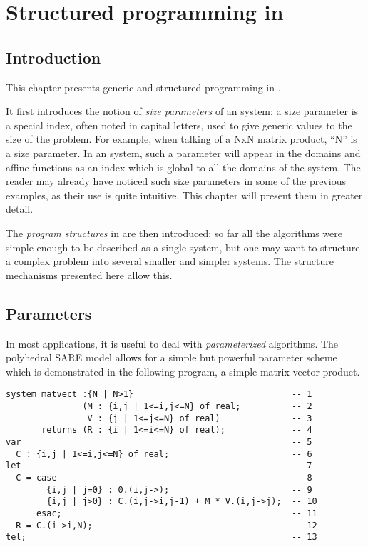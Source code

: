 

\chapter{Structured programming in {\alfa}}
\label{chapssubsystems}


\section{Introduction}

This chapter presents  generic and structured
programming in {\alfa}.

It first introduces the notion of \emph{size parameters} of an {\alfa}
system: a size parameter is a special index, often noted in capital
letters, used to give generic values to the size of the
problem. For example, when talking of a NxN matrix product, ``N'' is a
size parameter. In an {\alfa} system, such a parameter will appear in
the domains and affine functions as an index which is global to all
the domains of the system. The reader may already have noticed such
size parameters in some of the previous examples, as their use is
quite intuitive. This chapter will present them in greater detail.

The \emph{program structures} in {\alfa} are then introduced: so far
all the algorithms were simple enough to be described as a single
{\alfa} system, but one may want to structure a complex problem into
several smaller and simpler {\alfa} systems. The structure mechanisms
presented here allow this.
 

\section{Parameters\label{parameters}}

In most applications, it is useful to deal with \emph{parameterized}
algorithms. The polyhedral SARE model allows for a simple but powerful
parameter scheme which is demonstrated in the following program, a
simple matrix-vector product.

\begin{verbatim}
system matvect :{N | N>1}                               -- 1  
               (M : {i,j | 1<=i,j<=N} of real;          -- 2  
                V : {j | 1<=j<=N} of real)              -- 3  
       returns (R : {i | 1<=i<=N} of real);             -- 4  
var                                                     -- 5  
  C : {i,j | 1<=i,j<=N} of real;                        -- 6  
let                                                     -- 7  
  C = case                                              -- 8  
        {i,j | j=0} : 0.(i,j->);                        -- 9  
        {i,j | j>0} : C.(i,j->i,j-1) + M * V.(i,j->j);  -- 10 
      esac;                                             -- 11 
  R = C.(i->i,N);                                       -- 12 
tel;                                                    -- 13 
\end{verbatim}


